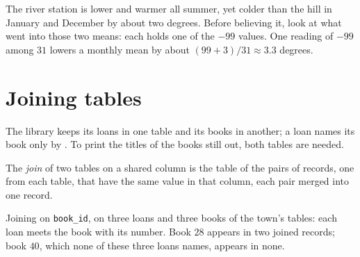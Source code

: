 \label{out:g10:data-tables:group-mean}

The river station is lower and warmer all summer, yet colder than the hill in January and December by about two
degrees. Before believing it, look at what went into those two means: each holds one of the $-99$ values. One
reading of $-99$ among $31$ lowers a monthly mean by about $(99 + 3)/31 \approx 3.3$ degrees.

\section{Joining tables}\label{sec:g10:data-tables:join}

The library keeps its loans in one table and its books in another; a loan names its book only by
. To print the titles of the books still out, both tables are needed.

\begin{definition}[Join]\label{def:g10:data-tables:join}
The \emph{join} of two tables on a shared column is the table of the pairs of records, one from each
table, that have the same value in that column, each pair merged into one record.
\end{definition}

\begin{omfigure}

{\small Joining on \texttt{book\_id}, on three loans and three books of the town's tables: each loan meets the book
with its number. Book $28$ appears in two joined records; book $40$, which none of these three loans names, appears in
none.}
\end{omfigure}

